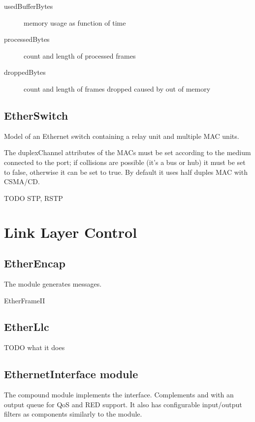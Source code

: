 \begin{description}
\item[usedBufferBytes] memory usage as function of time
\item[processedBytes] count and length of processed frames
\item[droppedBytes] count and length of frames dropped caused by out of memory
\end{description}


\subsection{EtherSwitch}

Model of an Ethernet switch containing a relay unit and multiple MAC units.

The duplexChannel attributes of the MACs must be set according to the
medium connected to the port; if collisions are possible (it's a bus or hub)
it must be set to false, otherwise it can be set to true.
By default it uses half duples MAC with CSMA/CD.

TODO STP, RSTP

\section{Link Layer Control}
\label{sec:LLC}

\subsection{EtherEncap}

The  module generates  messages.

EtherFrameII

\subsection{EtherLlc}

TODO what it does

\subsection{EthernetInterface module}

The  compound module implements the 
interface. Complements  and  with an output queue
for QoS and RED support. It also has configurable input/output filters as 
components similarly to the  module.



